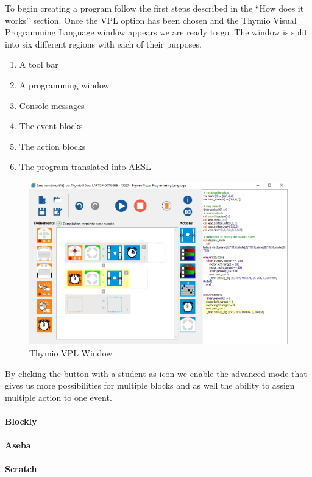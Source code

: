 \documentclass{scrartcl}
\begin{document}
To begin creating a program follow the first steps described in the “How does it works” section. 
Once the VPL option has been chosen and the Thymio Visual Programming Language window appears we are ready to go. 
The window is split into six different regions with each of their purposes.
\begin{enumerate}
  \item A tool bar
  \item A programming window
  \item Console messages
  \item The event blocks
  \item The action blocks
  \item The program translated into AESL
\end{enumerate}
\begin{figure}[h!]
  \includegraphics[width=\textwidth]{Thymio_VPL_window}
  \caption{Thymio VPL Window}
  \label{fig:thymio_vpl_window}
\end{figure}

By clicking the button with a student as icon we enable the advanced mode that gives us more possibilities for multiple blocks and as well the ability to assign multiple action to one event.

\paragraph{Blockly}
\paragraph{Aseba}
\paragraph{Scratch}
\end{document}
